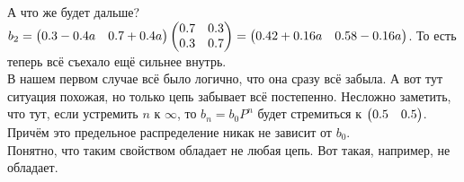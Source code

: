 \documentclass{article}
\begin{document}
\begin{itemize}
\begin{Comment}
\begin{figure}[H]
            \end{figure}\noindent
            А что же будет дальше? $b_2=\left(\begin{matrix}0.3-0.4a & 0.7+0.4a\end{matrix}\right)\left(\begin{matrix}0.7 & 0.3\\0.3 & 0.7\end{matrix}\right)=\left(\begin{matrix}0.42+0.16a & 0.58-0.16a\end{matrix}\right)$. То есть теперь всё съехало ещё сильнее внутрь.\\
            В нашем первом случае всё было логично, что она сразу всё забыла. А вот тут ситуация похожая, но только цепь забывает всё постепенно. Несложно заметить, что тут, если устремить $n$ к $\infty$, то $b_n=b_0P^n$ будет стремиться к $\left(\begin{matrix}0.5 & 0.5\end{matrix}\right)$. Причём это предельное распределение никак не зависит от $b_0$.\\
            Понятно, что таким свойством обладает не любая цепь. Вот такая, например, не обладает.
            \begin{figure}[H]
\end{figure}
\end{Comment}
\end{itemize}
\end{document}
